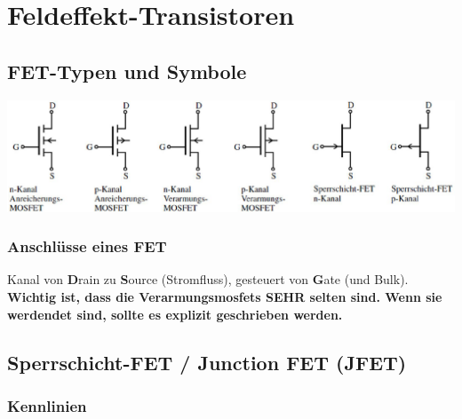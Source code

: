 \section{Feldeffekt-Transistoren}

\subsection{FET-Typen und Symbole}

\includegraphics[align=t, width=\columnwidth]{images/fet_symbole_typen.png}


\subsubsection{Anschlüsse eines FET}

Kanal von \textbf{D}rain zu \textbf{S}ource (Stromfluss), gesteuert von \textbf{G}ate (und Bulk).\\
\textbf{Wichtig ist, dass die Verarmungsmosfets SEHR selten sind. Wenn sie werdendet sind, sollte es explizit geschrieben werden.}


\subsection{Sperrschicht-FET / Junction FET (JFET)}

\subsubsection{Kennlinien}

